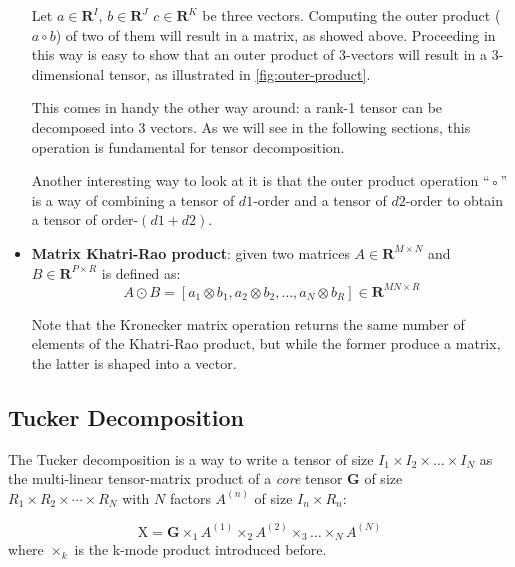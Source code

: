 \begin{itemize}
        Let $a \in \mathbf{R}^I$, $b \in \mathbf{R}^J$  $c \in \mathbf{R}^K$ be three vectors. Computing the outer 
        product ($a  \circ  b$) of two of them will result in a matrix, as showed above. Proceeding in this way is easy to show that an outer product of 3-vectors will result in a 3-dimensional tensor, as illustrated in \ref{fig:outer-product}.
        
        This comes in handy the other way around: a rank-1 tensor can be decomposed into 3 vectors. As we will see in the following sections, this operation is fundamental for tensor decomposition.
        
        Another interesting way to look at it is that the outer product operation “◦” is a way of combining a tensor of $d1$-order and a tensor of $d2$-order to obtain a tensor of order-$(d1+d2)$.

    \item \textbf{Matrix Khatri-Rao product}: given two matrices $A \in \mathbf{R}^{M \times N}$ and $B \in            \mathbf{R}^{P \times R}$ is defined as: 
        \begin{equation}
            A \odot B = [a_1 \otimes b_1, a_2 \otimes b_2, \ldots, a_N \otimes b_R] \in \mathbf{R}^{MN \times R}
        \end{equation}
        
        Note that the Kronecker matrix operation returns the same number of elements of the Khatri-Rao product, but while the former produce a matrix, the latter is shaped into a vector.   

\end{itemize}


\subsection{Tucker Decomposition}
The Tucker decomposition is a way to write a tensor of size $I_1 \times I_2 \times \ldots \times I_N$ as the multi-linear tensor-matrix product of a \emph{core} tensor $\mathbf{G}$ of size $R_1 \times R_2 \times \cdots \times R_N$ with $N$ factors $A^{(n)}$ of size $I_n \times R_n$:

\begin{equation}
\label{eq:tucker-general}
    \mathrm{X} = \mathbf{G} \times_{1} A^{(1)} \times_{2} A^{(2)} \times_{3} \ldots \times_{N} A^{(N)}
\end{equation}
where $\times_k$ is the k-mode product introduced before. 
\newline 
 
